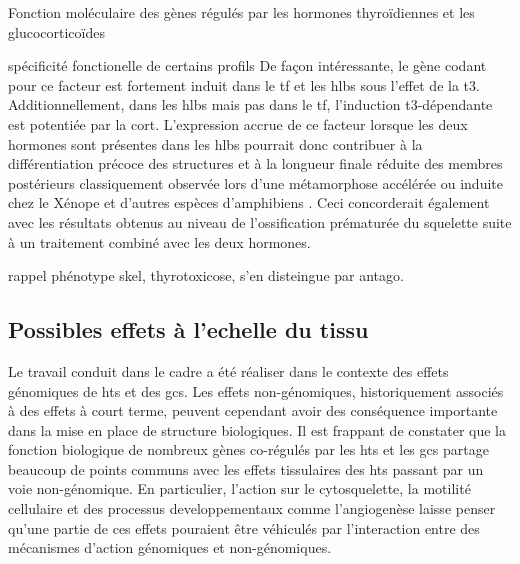 \documentclass[../main.tex]{subfiles}
\begin{document}
\begin{chapter}{Fonction moléculaire des gènes régulés par les hormones thyroïdiennes et les glucocorticoïdes}
\begin{section}{spécificité fonctionelle de certains profils}
De façon intéressante, le gène codant pour ce facteur est fortement induit dans le \gls{tf} et les \glspl{hlb} sous l'effet de la \gls{t3}.
Additionnellement, dans les \glspl{hlb} mais pas dans le \gls{tf}, l'induction \gls{t3}-dépendante est potentiée par la \gls{cort}.
L'expression accrue de ce facteur lorsque les deux hormones sont présentes dans les \glspl{hlb} pourrait donc contribuer à la différentiation précoce des structures et à la longueur finale réduite des membres postérieurs classiquement observée lors d'une métamorphose accélérée ou induite chez le Xénope et d'autres espèces d'amphibiens \citep{Gomez-Mestre2013a}.
Ceci concorderait également avec les résultats obtenus au niveau de l'ossification prématurée du squelette suite à un traitement combiné avec les deux hormones.

rappel phénotype skel, thyrotoxicose, s'en disteingue par antago.

\subsection{Possibles effets à l'echelle du tissu}
Le travail conduit dans le cadre a été réaliser dans le contexte des effets génomiques de \glspl{ht} et des \glspl{gc}.
Les effets non-génomiques, historiquement associés à des effets à court terme, peuvent cependant avoir des conséquence importante dans la mise en place de structure biologiques.
Il est frappant de constater que la fonction biologique de nombreux gènes co-régulés par les \glspl{ht} et les \glspl{gc} partage beaucoup de points communs avec les effets tissulaires des \glspl{ht} passant par un voie non-génomique.
En particulier, l'action sur le cytosquelette, la motilité cellulaire et des processus developpementaux comme l'angiogenèse laisse penser qu'une partie de ces effets pouraient être véhiculés par l'interaction entre des mécanismes d'action génomiques et non-génomiques.

\end{section}

\end{chapter}
\end{document}
